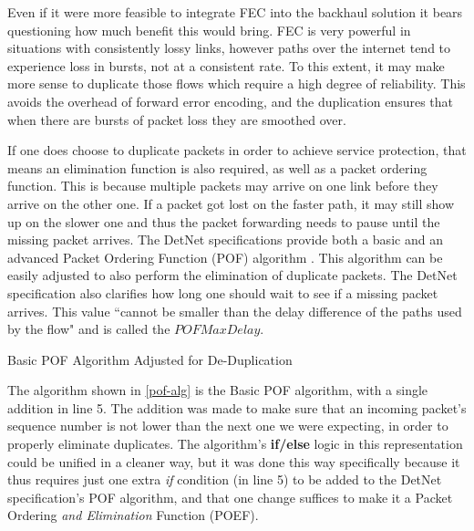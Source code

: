 Even if it were more feasible to integrate FEC into the backhaul solution it bears questioning how much benefit this would bring. FEC is very powerful in situations with consistently lossy links, however paths over the internet tend to experience loss in bursts, not at a consistent rate. To this extent, it may make more sense to duplicate those flows which require a high degree of reliability. This avoids the overhead of forward error encoding, and the duplication ensures that when there are bursts of packet loss they are smoothed over.

If one does choose to duplicate packets in order to achieve service protection, that means an elimination function is also required, as well as a packet ordering function. This is because multiple packets may arrive on one link before they arrive on the other one. If a packet got lost on the faster path, it may still show up on the slower one and thus the packet forwarding needs to pause until the missing packet arrives. The DetNet specifications provide both a basic and an advanced Packet Ordering Function (POF) algorithm \cite{ietf-detnet-pof-08}. This algorithm can be easily adjusted to also perform the elimination of duplicate packets. The DetNet specification also clarifies how long one should wait to see if a missing packet arrives. This value “cannot be smaller than the delay difference of the paths used by the flow" and is called the $POFMaxDelay$.

\begin{algorithm}[H]
\label{pof-alg}


\caption{Basic POF Algorithm Adjusted for De-Duplication}
\end{algorithm}

The algorithm shown in \ref{pof-alg} is the Basic POF algorithm, with a single addition in line 5. The addition was made to make sure that an incoming packet's sequence number is not lower than the next one we were expecting, in order to properly eliminate duplicates. The algorithm's \textbf{if/else} logic in this representation could be unified in a cleaner way, but it was done this way specifically because it thus requires just one extra \textit{if} condition (in line 5) to be added to the DetNet specification's POF algorithm, and that one change suffices to make it a Packet Ordering \textit{and Elimination} Function (POEF).

